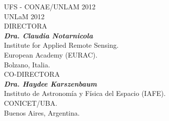 \begin{titlepage}
\begin{center}
\newpage

\thispagestyle{empty}
\vspace*{1cm}
\textcopyright UFS - CONAE/UNLAM 2012\\
\textcopyright UNLaM 2012\\

\vspace*{5cm}
\normalsize DIRECTORA\\
\normalsize\textit{\textbf{Dra. Claudia Notarnicola}}\\
Institute for Applied Remote Sensing.\\ European Academy (EURAC).\\ Bolzano, Italia.\\
\vspace*{3cm}
\normalsize CO-DIRECTORA\\
\normalsize \textit{\textbf{Dra. Haydee Karszenbaum}}\\
Instituto de Astronomía y Física del Espacio (IAFE).\\ CONICET/UBA.\\ Buenos Aires, Argentina.


	
% 



\end{center}
\end{titlepage} 

\newpage
\thispagestyle{empty}
\mbox{}
